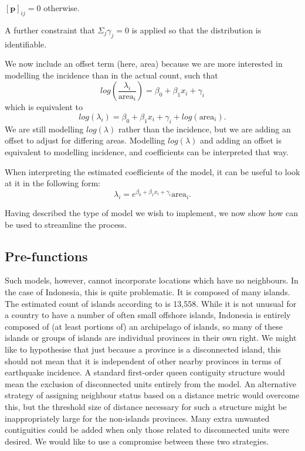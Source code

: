 \([\textbf{p}]_{ij} = 0\) otherwise.

A further constraint that \(\Sigma_j \gamma_j = 0\) is applied so that the
distribution is identifiable.

We now include an offset term (here, area) because we are more interested
in modelling the incidence than in the actual count, such that
\begin{equation}
log(\frac{\lambda_i} {\text{area}_i}) = \beta_0 + \beta_1x_i + \gamma_i
\label{eq:eq6}
\end{equation}
which is equivalent to
\begin{equation}
log(\lambda_i) = \beta_0 + \beta_1x_i + \gamma_i + log(\text{area}_i).
\label{eq:eq7}
\end{equation}
We are still modelling \(log(\lambda)\) rather than the incidence, but we
are adding an offset to adjust for differing areas. Modelling \(log(\lambda)\) and adding an offset is equivalent to
modelling incidence, and coefficients can be interpreted that way.

When interpreting the estimated coefficients of the model, it can be
useful to look at it in the following form:
\begin{equation}
\lambda_i = e^{\beta_0 + \beta_1 x_i + \gamma_i} \text{area}_i.
\label{eq:eq8}
\end{equation}

Having described the type of model we wish to implement, we now show how  can be used to streamline the process.

\subsection{Pre-functions}\label{pre-functions-1}

Such models, however, cannot incorporate locations which have no
neighbours. In the case of Indonesia, this is quite problematic. It is
composed of many islands. The estimated count of
islands according to \citet{Andrfout2022} is 13,558.
While it is not unusual for a country to have a number of often small
offshore islands, Indonesia is entirely composed of (at least portions
of) an archipelago of islands, so many of these islands or groups of
islands are individual provinces in their own right. We might like to hypothesise that just because a province is a disconnected island, this should not mean that it is independent of other nearby provinces in terms of earthquake incidence. A standard first-order queen contiguity structure would mean the exclusion of disconnected units entirely from the model. An alternative strategy of assigning neighbour status based on a distance metric would overcome this, but the threshold size of distance necessary for such a structure might be inappropriately large for the non-islands provinces. Many extra unwanted contiguities could be added when only those related to disconnected units were desired. We would like to use a compromise between these two strategies.

